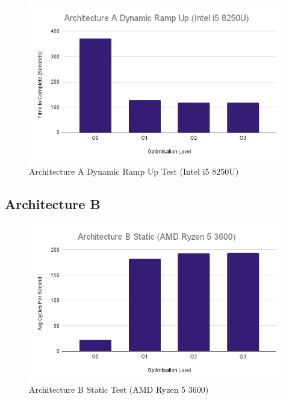 \documentclass{article}
\begin{document}
\begin{figure}[!h]
\centering
\includegraphics[scale=0.5]{Architecture A Dynamic Ramp Up (Intel i5 8250U).png}
\caption{Architecture A Dynamic Ramp Up Test (Intel i5 8250U)}
\label{arch_a_dynamic_ramp_up_laptop}
\end{figure}

\clearpage

\subsection{Architecture B}
\begin{figure}[!h]
\centering
\includegraphics[scale=0.5]{Architecture B Static (AMD Ryzen 5 3600).png}
\caption{Architecture B Static Test (AMD Ryzen 5 3600)}
\label{arch_b_static_pc}
\end{figure}
\end{document}
